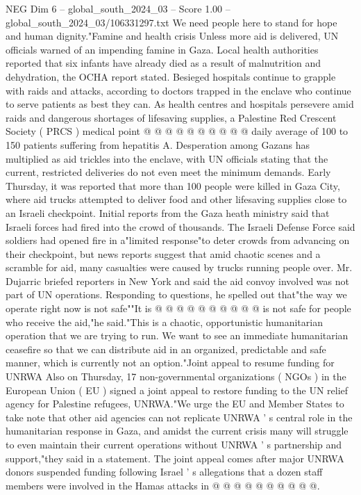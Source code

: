 \begin{textsample}{NEG Dim 6 – global\_south\_2024\_03 – Score 1.00 – global\_south\_2024\_03/106331297.txt}
We need people here to stand for hope and human dignity."Famine and health crisis Unless more aid is delivered, UN officials warned of an impending famine in Gaza.
Local health authorities reported that six infants have already died as a result of malnutrition and dehydration, the OCHA report stated.
Besieged hospitals continue to grapple with raids and attacks, according to doctors trapped in the enclave who continue to serve patients as best they can.
As health centres and hospitals persevere amid raids and dangerous shortages of lifesaving supplies, a Palestine Red Crescent Society ( PRCS ) medical point @ @ @ @ @ @ @ @ @ @ daily average of 100 to 150 patients suffering from hepatitis A.
Desperation among Gazans has multiplied as aid trickles into the enclave, with UN officials stating that the current, restricted deliveries do not even meet the minimum demands.
Early Thursday, it was reported that more than 100 people were killed in Gaza City, where aid trucks attempted to deliver food and other lifesaving supplies close to an Israeli checkpoint.
Initial reports from the Gaza heath ministry said that Israeli forces had fired into the crowd of thousands.
The Israeli Defense Force said soldiers had opened fire in a"limited response"to deter crowds from advancing on their checkpoint, but news reports suggest that amid chaotic scenes and a scramble for aid, many casualties were caused by trucks running people over.
Mr.
Dujarric briefed reporters in New York and said the aid convoy involved was not part of UN operations.
Responding to questions, he spelled out that"the way we operate right now is not safe""It is @ @ @ @ @ @ @ @ @ @ is not safe for people who receive the aid,"he said."This is a chaotic, opportunistic humanitarian operation that we are trying to run.
We want to see an immediate humanitarian ceasefire so that we can distribute aid in an organized, predictable and safe manner, which is currently not an option."Joint appeal to resume funding for UNRWA Also on Thursday, 17 non-governmental organizations ( NGOs ) in the European Union ( EU ) signed a joint appeal to restore funding to the UN relief agency for Palestine refugees, UNRWA."We urge the EU and Member States to take note that other aid agencies can not replicate UNRWA ' s central role in the humanitarian response in Gaza, and amidst the current crisis many will struggle to even maintain their current operations without UNRWA ' s partnership and support,"they said in a statement.
The joint appeal comes after major UNRWA donors suspended funding following Israel ' s allegations that a dozen staff members were involved in the Hamas attacks in @ @ @ @ @ @ @ @ @ @.

\end{textsample}
